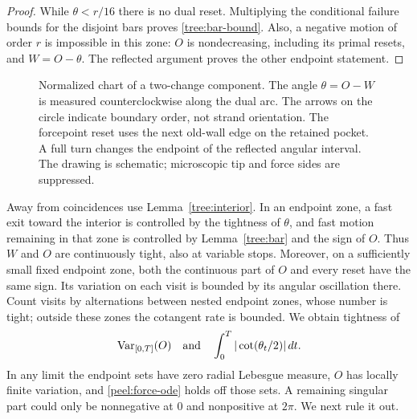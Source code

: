 \begin{proof}
While $\theta<r/16$ there is no dual reset.  Multiplying the conditional
failure bounds for the disjoint bars proves \eqref{tree:bar-bound}.
Also, a negative motion of order $r$ is impossible in this zone:
$O$ is nondecreasing, including its primal resets, and $W=O-\theta$.
The reflected argument proves the other endpoint statement.
\end{proof}

\begin{figure}[ht]
\centering
{}
\caption{Normalized chart of a two-change component.  The angle
$\theta=O-W$ is measured counterclockwise along the dual arc.
The arrows on the circle indicate boundary order, not strand
orientation.  The forcepoint reset uses the next old-wall edge on the
retained pocket.  A full turn changes the endpoint of the reflected
angular interval.  The drawing is schematic; microscopic tip and
force sides are suppressed.}
\label{tree:figure}
\end{figure}

Away from coincidences use Lemma~\ref{tree:interior}.  In an endpoint
zone, a fast exit toward the interior is controlled by the tightness
of $\theta$, and fast motion remaining in that zone is controlled by
Lemma~\ref{tree:bar} and the sign of $O$.  Thus $W$ and $O$ are
continuously tight, also at variable stops.  Moreover, on a sufficiently
small fixed endpoint zone, both the continuous part of $O$ and every
reset have the same sign.  Its variation on each visit is bounded by
its angular oscillation there.  Count visits by alternations between
nested endpoint zones, whose number is tight; outside these zones the
cotangent rate is bounded.  We obtain tightness of
\begin{equation}\label{tree:variation}
 \operatorname{Var}_{[0,T]}(O)
 \quad\hbox{and}\quad
 \int_0^T|\cot(\theta_t/2)|\,dt.
\end{equation}
In any limit the endpoint sets have zero radial Lebesgue measure,
$O$ has locally finite variation, and \eqref{peel:force-ode} holds off
those sets.  A remaining singular part could only be nonnegative at
$0$ and nonpositive at $2\pi$.  We next rule it out.

